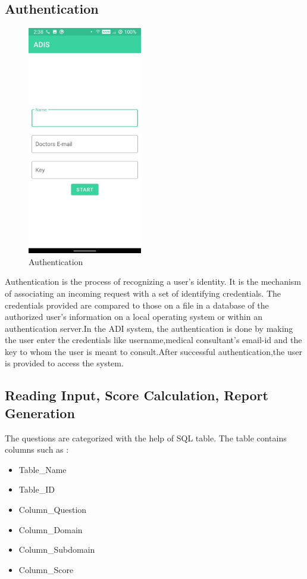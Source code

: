 \subsection{Authentication}
\begin{figure}[h]
\label{ss}
\centering
\includegraphics[width=5cm]{authentication.jpeg}
\caption{Authentication}
\end{figure}
Authentication is the process of recognizing a user’s identity. It is the mechanism of associating an incoming request with a set of identifying credentials. The credentials provided are compared to those on a file in a database of the authorized user’s information on a local operating system or within an authentication server.In the ADI system, the authentication is done by making the user enter the credentials like username,medical consultant’s email-id and the key to whom the user is meant to consult.After successful authentication,the user is provided to access the system.
\subsection{Reading Input, Score Calculation, Report Generation}
The questions are categorized with the help of SQL table. The table contains columns such as :
\begin{itemize}
    \item Table\_Name
    \item Table\_ID
    \item Column\_Question
    \item Column\_Domain
    \item Column\_Subdomain
    \item Column\_Score
\end{itemize}


